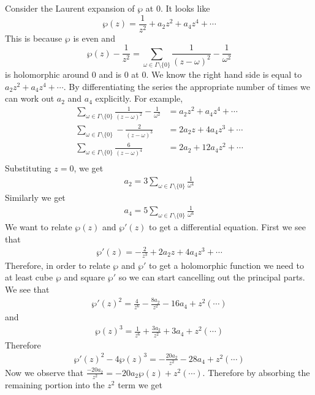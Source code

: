 \secbreak

Consider the Laurent expansion of $\wp$ at 0. It looks like 
$$\wp(z) = \frac{1}{z^2} + a_2z^2 + a_4 z^4 + \cdots$$
This is because $\wp$ is even and 
$$\wp(z) - \frac{1}{z^2} = \sum_{\omega \in \Gamma \setminus \{0\}} \frac{1}{(z - \omega)^2} - \frac{1}{\omega^2}$$
is holomorphic around 0 and is 0 at 0. We know the right hand side is equal to $a_2 z^2 + a_4 z^4 + \cdots$. By differentiating the series the appropriate number of times we can work out $a_2$ and $a_4$ explicitly. For example,
\begin{align*}
    \sum_{\omega \in \Gamma \setminus \{0\}} \frac{1}{(z - \omega)^2} - \frac{1}{\omega^2} &= a_2 z^2 + a_4 z^4 + \cdots\\
    \sum_{\omega \in \Gamma \setminus \{0\}} -\frac{2}{(z - \omega)^3} &= 2a_2 z + 4 a_4 z^3 + \cdots\\
    \sum_{\omega \in \Gamma \setminus \{0\}} \frac{6}{(z - \omega)^4} &= 2a_2 + 12 a_4 z^2 + \cdots \\
\end{align*}
Substituting $z = 0$, we get 
\begin{align*}
    a_2 = 3 \sum_{\omega \in \Gamma \setminus \{0\}} \frac{1}{\omega^4}
\end{align*}
Similarly we get 
\begin{align*}
    a_4 = 5 \sum_{\omega \in \Gamma \setminus \{0\}} \frac{1}{\omega^6}
\end{align*}
We want to relate $\wp(z)$ and $\wp'(z)$ to get a differential equation. First we see that 
\begin{align*}
    \wp'(z) = -\frac{2}{z^3} + 2a_2 z + 4a_4 z^3 + \cdots 
\end{align*}
Therefore, in order to relate $\wp$ and $\wp'$ to get a holomorphic function we need to at least cube $\wp$ and square $\wp'$ so we can start cancelling out the principal parts. We see that  
\begin{align*}
    \wp'(z)^2 = \frac{4}{z^6} - \frac{8a_2}{z^2} - 16a_4 + z^2(\cdots)
\end{align*}
and
\begin{align*}
    \wp(z)^3 = \frac{1}{z^6} + \frac{3a_2}{z^2} + 3a_4 + z^2(\cdots)
\end{align*}
Therefore
\begin{align*}
    \wp'(z)^2 - 4\wp(z)^3 = -\frac{20 a_2}{z^2} - 28 a_4 + z^2(\cdots)
\end{align*}
Now we observe that $\frac{-20a_2}{z^2} = -20a_2 \wp(z) + z^2(\cdots)$. Therefore by absorbing the remaining portion into the $z^2$ term we get 
